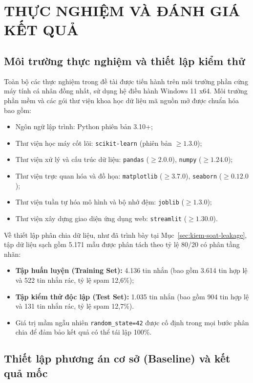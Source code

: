 \chapter{THỰC NGHIỆM VÀ ĐÁNH GIÁ KẾT QUẢ}
\label{chap:chuong4}

\section{Môi trường thực nghiệm và thiết lập kiểm thử}
\label{sec:moi-truong-thuc-nghiem}

Toàn bộ các thực nghiệm trong đề tài được tiến hành trên môi trường phần cứng máy tính cá nhân đồng nhất, sử dụng hệ điều hành Windows 11 x64. Môi trường phần mềm và các gói thư viện khoa học dữ liệu mã nguồn mở được chuẩn hóa bao gồm:
\begin{itemize}
    \item Ngôn ngữ lập trình: Python phiên bản 3.10+;
    \item Thư viện học máy cốt lõi: \texttt{scikit-learn} (phiên bản $\ge 1.3.0$);
    \item Thư viện xử lý và cấu trúc dữ liệu: \texttt{pandas} ($\ge 2.0.0$), \texttt{numpy} ($\ge 1.24.0$);
    \item Thư viện trực quan hóa và đồ họa: \texttt{matplotlib} ($\ge 3.7.0$), \texttt{seaborn} ($\ge 0.12.0$);
    \item Thư viện tuần tự hóa mô hình và bộ nhớ đệm: \texttt{joblib} ($\ge 1.3.0$);
    \item Thư viện xây dựng giao diện ứng dụng web: \texttt{streamlit} ($\ge 1.30.0$).
\end{itemize}

Về thiết lập phân chia dữ liệu, như đã trình bày tại Mục~\ref{sec:kiem-soat-leakage}, tập dữ liệu sạch gồm 5.171 mẫu được phân tách theo tỷ lệ 80/20 có phân tầng nhãn:
\begin{itemize}
    \item \textbf{Tập huấn luyện (Training Set):} 4.136 tin nhắn (bao gồm 3.614 tin hợp lệ và 522 tin nhắn rác, tỷ lệ spam 12,6\%);
    \item \textbf{Tập kiểm thử độc lập (Test Set):} 1.035 tin nhắn (bao gồm 904 tin hợp lệ và 131 tin nhắn rác, tỷ lệ spam 12,7\%).
    \item Giá trị mầm ngẫu nhiên \texttt{random\_state=42} được cố định trong mọi bước phân chia để đảm bảo kết quả có thể tái lập 100\%.
\end{itemize}

\section{Thiết lập phương án cơ sở (Baseline) và kết quả mốc}
\label{sec:baseline-ket-qua}


